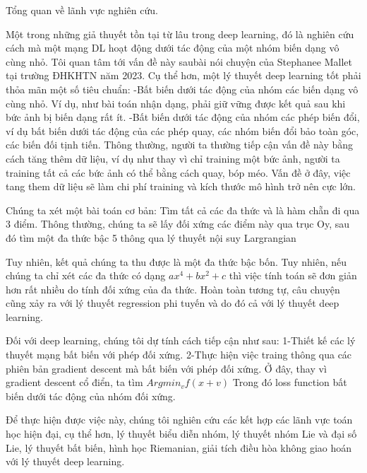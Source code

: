 
Tổng quan về lãnh vực nghiên cứu.


Một trong những giả thuyết tồn tại từ lâu trong deep learning, đó là nghiên cứu cách mà  một mạng DL hoạt động dưới tác động của một nhóm  biến dạng vô cùng nhỏ. Tôi quan tâm tới vấn đề này saubài nói chuyện của Stephanee Mallet tại trường ĐHKHTN năm 2023.
Cụ thể hơn, một lý thuyết deep learning tốt phải thỏa mãn một số tiêu chuẩn:
-Bất biến dưới tác động của nhóm các biến dạng vô cùng nhỏ. Ví dụ, như bài toán nhận dạng, phải giữ vững được kết quả sau khi bức ảnh bị biến dạng rất ít.
-Bất biến dưới tác động của nhóm các phép biến đổi, ví dụ bất biến dưới tác động của các phép quay, các nhóm biến đổi bảo toàn góc, các biến đối tịnh tiến.
Thông thường, người ta thường tiếp cận vấn đề này bằng cách tăng thêm dữ liệu, ví dụ như thay vì chỉ training một bức ảnh, người ta training tất cả các bức ảnh có thể bằng cách quay, bóp méo. Vấn đề ở đây, việc tang them dữ liệu sẽ làm chi phí training và kích thước mô hình trở nên cực lớn.

Chúng ta xét một bài toán cơ bản: Tìm tất cả các đa thức và là hàm chẵn đi qua 3 điểm.
Thông thường, chúng ta sẽ lấy đối xứng các điểm này qua trục Oy, sau đó tìm một đa thức bậc 5  thông qua lý thuyết nội suy Largrangian

\begin{center}
\end{center}

Tuy nhiên, kết quả chúng ta thu được là một đa thức bậc bốn. Tuy nhiên, nếu chúng ta chỉ xét các đa thức có dạng $ax^4+bx^2+c$ thì việc tính toán sẽ đơn giản hơn rất nhiều do tính đối xứng của đa thức.
Hoàn toàn tương tự, câu chuyện cũng xảy ra với lý thuyết regression phi tuyến và do đó cả với lý thuyết deep learning.

Đối với deep learning, chúng tôi dự tính cách tiếp cận như sau:
1-Thiết kế các lý thuyết mạng bất biến với phép đối xứng.
2-Thực hiện việc traing thông qua các phiên bản gradient descent mà bất biến với phép đối xứng.
Ở đây, thay vì gradient descent cổ điển, ta tìm $Argmin_v f(x+v) $ 
Trong đó loss function bất biến dưới tác động của nhóm đối xứng.


Để thực hiện được việc này, chúng tôi nghiên cứu các kết hợp các lãnh vực toán học hiện đại, cụ thể hơn, lý thuyết biểu diễn nhóm, lý thuyết nhóm Lie và đại số Lie, lý thuyết bất biến, hình học Riemanian, giải tích điều hòa không giao hoán với lý thuyết deep learning. 

